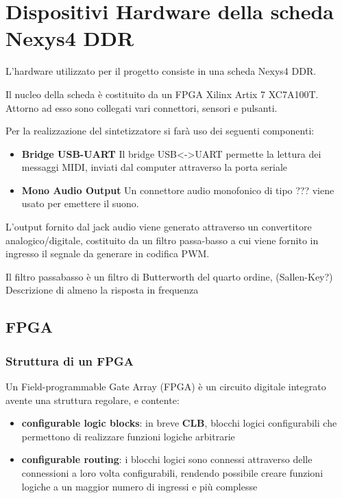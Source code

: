 \chapter{Dispositivi Hardware della scheda Nexys4 DDR}

L'hardware utilizzato per il progetto consiste in una scheda Nexys4 DDR.

Il nucleo della scheda è costituito da un FPGA Xilinx Artix 7 XC7A100T.
Attorno ad esso sono collegati vari connettori, sensori e pulsanti.

Per la realizzazione del sintetizzatore si farà uso dei seguenti componenti:
\begin{itemize}
    \item \textbf{Bridge USB-UART} Il bridge USB<->UART permette la lettura
          dei messaggi MIDI, inviati dal computer attraverso la porta seriale
    \item \textbf{Mono Audio Output} Un connettore audio monofonico di tipo ??? 
          viene usato per emettere il suono.
\end{itemize}

L'output fornito dal jack audio viene generato attraverso un convertitore analogico/digitale,
costituito da un filtro passa-basso a cui viene fornito in ingresso il segnale
da generare in codifica PWM.

Il filtro passabasso è un filtro di Butterworth del quarto ordine, (Sallen-Key?)
Descrizione di almeno la risposta in frequenza


\section{FPGA}
\subsection{Struttura di un FPGA}
Un Field-programmable Gate Array (FPGA) è un circuito digitale integrato
avente una struttura regolare, e contente:
\begin{itemize}
    \item \textbf{configurable logic blocks}: in breve \textbf{CLB}, blocchi
            logici configurabili che permettono di realizzare funzioni
            logiche arbitrarie
    \item \textbf{configurable routing}: i blocchi logici sono connessi
          attraverso delle connessioni a loro volta configurabili,
          rendendo possibile creare funzioni logiche a un maggior numero
          di ingressi e più complesse
\end{itemize}

